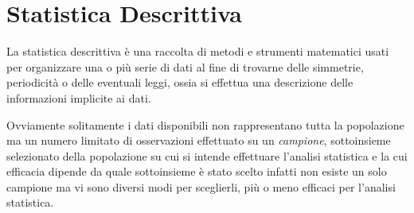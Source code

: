 \documentclass[a4paper,12pt, oneside]{book}
\begin{document}
\chapter{Statistica Descrittiva}
La statistica descrittiva è una raccolta di metodi e strumenti matematici usati per organizzare una o più serie di dati
al fine di trovarne delle simmetrie, periodicità o delle eventuali leggi, ossia si effettua una descrizione 
delle informazioni implicite ai dati.

Ovviamente solitamente i dati disponibili non rappresentano tutta la popolazione ma un numero limitato 
di osservazioni effettuato su un \emph{campione}, sottoinsieme selezionato della popolazione su cui si intende
effettuare l'analisi statistica e la cui efficacia dipende da quale sottoinsieme è stato scelto infatti non esiste
un solo campione ma vi sono diversi modi per sceglierli, più o meno efficaci per l'analisi statistica.
\end{document}
